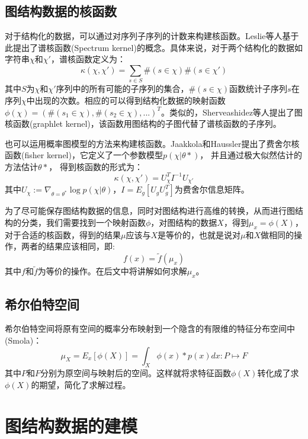 \subsection{图结构数据的核函数}
对于结构化的数据，可以通过对序列子序列的计数来构建核函数。Leslie\cite{leslie2001spectrum}等人基于此提出了谱核函数(Spectrum kernel)的概念。具体来说，对于两个结构化的数据如字符串$\chi$和$\chi'$，谱核函数定义为：
\begin{equation}
\kappa(\chi, \chi') = \sum_{s\in S}\#(s\in \chi)\#(s \in \chi')
\end{equation}
其中$S$为$\chi$和$\chi'$序列中的所有可能的子序列的集合，$\#(s\in \chi)$函数统计子序列$s$在序列$\chi$中出现的次数。相应的可以得到结构化数据的映射函数$\phi(\chi)=(\#(s_1\in \chi), \#(s_2\in \chi), ...)^T$。类似的，Sherveashidez\cite{shervashidze2009efficient}等人提出了图核函数(graphlet kernel)，该函数用图结构的子图代替了谱核函数的子序列。
\par 也可以运用概率图模型的方法来构建核函数。Jaakkola和Haussler\cite{jaakkola1999using}提出了费舍尔核函数(fisher kernel)，它定义了一个参数模型$p(\chi|\theta*)$， 并且通过极大似然估计的方法估计$\theta*$， 得到核函数的形式为：
\begin{equation}
\kappa(\chi, \chi') = U_\chi^TI^{-1}U_{\chi'}
\end{equation}
其中$U_\chi := \nabla_{\theta=\theta^*}\log p(\chi|\theta)$，$I=E_g[U_gU_g^T]$为费舍尔信息矩阵。
\par 为了尽可能保存图结构数据的信息，同时对图结构进行高维的转换，从而进行图结构的分类，我们需要找到一个映射函数$\phi$，对图结构的数据$X$，得到$\mu_x = \phi(X)$，对于合适的核函数，得到的结果$\mu$应该与$X$是等价的，也就是说对$\mu$和$X$做相同的操作，两者的结果应该相同，即:
$$f(x)=\tilde{f}(\mu_x)$$
其中$f$和$\tilde{f}$为等价的操作。在后文中将讲解如何求解$\mu_x$。
\subsection{希尔伯特空间}
希尔伯特空间将原有空间的概率分布映射到一个隐含的有限维的特征分布空间中(Smola\cite{smola2007hilbert})：
$$\mu_X = E_x [\phi(X)] = \int_X \phi(x)*p(x)dx : P\mapsto F$$
其中$P$和$F$分别为原空间与映射后的空间。这样就将求特征函数$\phi(X)$转化成了求$\phi(X)$的期望，简化了求解过程。
\section{图结构数据的建模}

